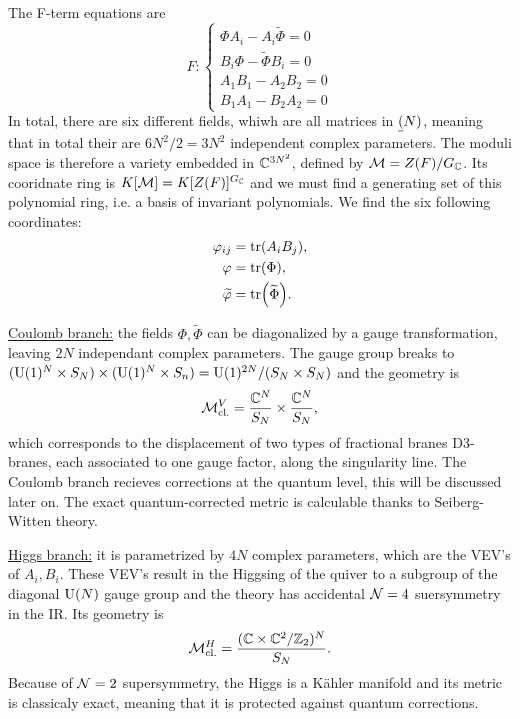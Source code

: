         The F-term equations are
        \begin{equation}
            F:
            \begin{cases}
                \Phi A_i-A_i\tilde{\Phi} = 0\\
                B_i\Phi-\tilde{\Phi}B_i = 0\\
                A_1B_1-A_2B_2 = 0\\
                B_1A_1-B_2A_2 = 0
            \end{cases}
        \end{equation}
        In total, there are six different fields, whiwh are all matrices in $\underline{(}N)$, meaning that in total their are $6N^2/2=3N^2$ independent complex parameters. The moduli space is therefore a variety embedded in $\mathbb{C}^{3N^2}$, defined by $\mathcal{M}=Z(F)/G_{\mathbb{C}}$. Its cooridnate ring is $K[\mathcal{M}]=K[Z(F)]^{G_{\mathbb{C}}}$ and we must find a generating set of this polynomial ring, i.e. a basis of invariant polynomials. We find the six following coordinates:
        \begin{align}
            \varphi_{ij} &= \tr (A_i B_j),\\
            \varphi &= \tr(\Phi),\\
            \widetilde{\varphi} &= \tr ( \widetilde{\Phi} ).
        \end{align}

        \underline{Coulomb branch:} the fields $\Phi,\tilde{\Phi}$ can be diagonalized by a gauge transformation, leaving $2N$ independant complex parameters. The gauge group breaks to $(\text{U}(1)^{N}\times S_N)\times(\text{U}(1)^{N}\times S_n)=\text{U}(1)^{2N}/(S_N\times S_N)$ and the geometry is
        \begin{equation}
            \mathcal{M}^V_{\text{cl.}} = \frac{\mathbb{C}^N}{S_N}\times\frac{\mathbb{C}^N}{S_N},
        \end{equation}
        which corresponds to the displacement of two types of fractional branes D$3$-branes, each associated to one gauge factor, along the singularity line. The Coulomb branch recieves corrections at the quantum level, this will be discussed later on. The exact quantum-corrected metric is calculable thanks to Seiberg-Witten theory\cite{Witten_1997}.


        \underline{Higgs branch:} it is parametrized by $4N$ complex parameters, which are the VEV's of $A_i,B_i$. These VEV's result in the Higgsing of the quiver to a subgroup of the diagonal $\text{U}(N)$ gauge group and the theory has accidental $\mathcal{N}=4$ suersymmetry in the IR. Its geometry is
        \begin{equation}
            \mathcal{M}^H_{\text{cl.}} = \frac{(\mathbb{C}\times\mathbb{C}^2/\mathbb{Z}_2)^N}{S_N}.
        \end{equation}
        Because of $\mathcal{N}=2$ supersymmetry, the Higgs is a Kähler manifold and its metric is classicaly exact, meaning that it is protected against quantum corrections.

